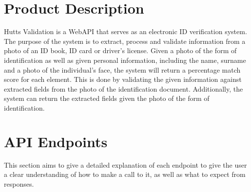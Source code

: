 \documentclass{article}
\begin{document}
\cleardoublepage
\thispagestyle{empty}
\tableofcontents
\newpage

\setcounter{page}{1}

\section{Product Description}
Hutts Validation is a WebAPI that serves as an electronic ID verification system. The purpose of the system is to extract, process and validate information from a photo of an ID book, ID card or driver's license. Given a photo of the form of identification as well as given personal information, including the name, surname and a photo of the individual's face, the system will return a percentage match score for each element. This is done by validating the given information against extracted fields from the photo of the identification document. Additionally, the system can return the extracted fields given the photo of the form of identification.

\section{API Endpoints}
This section aims to give a detailed explanation of each endpoint to give the user a clear understanding of how to make a call to it, as well as what to expect from responses.
\end{document}
